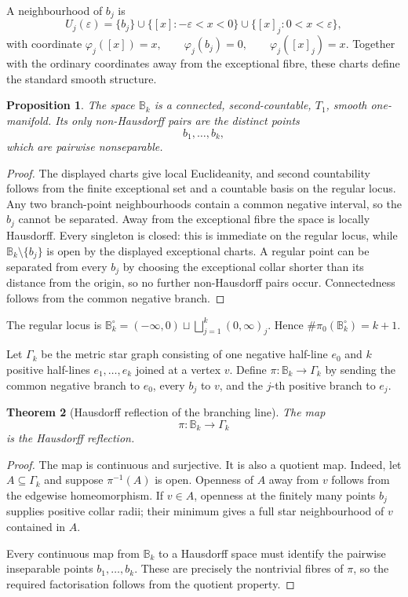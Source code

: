 \documentclass[11pt]{article}
\theoremstyle{plain}
\newtheorem{theorem}{Theorem}[section]
\newtheorem{proposition}[theorem]{Proposition}
\theoremstyle{definition}
\begin{document}
A neighbourhood of \(b_j\) is
\[
  U_j(\varepsilon)
  =
  \{b_j\}
  \cup
  \{[x]:-\varepsilon<x<0\}
  \cup
  \{[x]_j:0<x<\varepsilon\},
\]
with coordinate
\(\varphi_j([x])=x, \qquad \varphi_j(b_j)=0, \qquad \varphi_j([x]_j)=x\).
Together with the ordinary coordinates away from the exceptional fibre,
these charts define the standard smooth structure.

\begin{proposition}
\label{prop:Bk-topology}
The space \(\mathbb B_k\) is a connected, second-countable, \(T_1\), smooth
one-manifold. Its only non-Hausdorff pairs are the distinct points
\[
  b_1,\ldots,b_k,
\]
which are pairwise nonseparable.
\end{proposition}

\begin{proof}
The displayed charts give local Euclideanity, and second countability follows
from the finite exceptional set and a countable basis on the regular locus.
Any two branch-point neighbourhoods contain a common negative interval, so
the \(b_j\) cannot be separated. Away from the exceptional fibre the space
is locally Hausdorff. Every singleton is closed: this is immediate on the
regular locus, while \(\mathbb B_k\setminus\{b_j\}\) is open by the displayed
exceptional charts. A regular point can be separated from every \(b_j\) by
choosing the exceptional collar shorter than its distance from the origin,
so no further non-Hausdorff pairs occur. Connectedness follows from the common
negative branch.
\end{proof}

The regular locus is
\(\mathbb B_k^\circ = (-\infty,0) \sqcup \bigsqcup_{j=1}^{k}(0,\infty)_j\).
Hence
\(\#\pi_0(\mathbb B_k^\circ)=k+1\).

Let \(\Gamma_k\) be the metric star graph consisting of one negative
half-line \(e_0\) and \(k\) positive half-lines \(e_1,\ldots,e_k\) joined at a vertex \(v\). Define \(\pi:\mathbb B_k\longrightarrow\Gamma_k\) by sending the common negative branch to \(e_0\), every \(b_j\) to \(v\),
and the \(j\)-th positive branch to \(e_j\).

\begin{theorem}[Hausdorff reflection of the branching line]
\label{thm:Bk-Hausdorff-reflection}
The map
\[
  \pi:\mathbb B_k\longrightarrow\Gamma_k
\]
is the Hausdorff reflection.
\end{theorem}

\begin{proof}
The map is continuous and surjective. It is also a quotient map. Indeed, let
\(A\subseteq\Gamma_k\) and suppose \(\pi^{-1}(A)\) is open. Openness of
\(A\) away from \(v\) follows from the edgewise homeomorphism. If \(v\in A\),
openness at the finitely many points \(b_j\) supplies positive collar radii;
their minimum gives a full star neighbourhood of \(v\) contained in \(A\).

Every continuous map from \(\mathbb B_k\) to a Hausdorff space must identify
the pairwise inseparable points \(b_1,\ldots,b_k\). These are precisely the
nontrivial fibres of \(\pi\), so the required factorisation follows from the
quotient property.
\end{proof}
\end{document}

